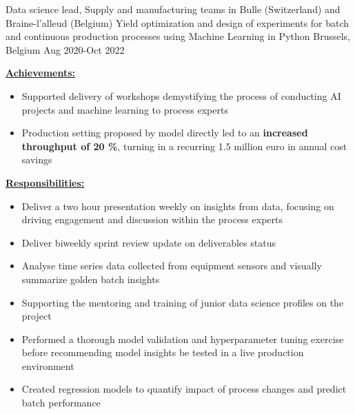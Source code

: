 \begin{cventries}
  \cventry
    {Data science lead, Supply and manufacturing teams in Bulle (Switzerland) and Braine-l'alleud (Belgium)} %
    {Yield optimization and design of experiments for batch and continuous production processes using Machine Learning in Python} %
    {Brussels, Belgium} %
    {Aug 2020-Oct 2022} %
    {
    \begin{cvitems}
        \item {\underline{\textbf{Achievements:}}}
            \begin{itemize}
                \item {Supported delivery of workshops demystifying the process of conducting AI projects and machine learning to process experts}
               \item {Production setting proposed by model directly led to an \textbf{increased throughput of 20 \%}, turning in a recurring 1.5 million euro in annual cost savings}
            \end{itemize}
        \item {\underline{\textbf{Responsibilities:}}}
         \begin{itemize}
            \item {Deliver a two hour presentation weekly on insights from data, focusing on driving engagement and discussion within the  process experts}
            \item {Deliver biweekly sprint review update on deliverables status}
            \item {Analyse time series data collected from equipment sensors and visually summarize golden batch insights}
            \item {Supporting the mentoring and training of junior data science profiles on the project}
            \item {Performed a thorough model validation and hyperparameter tuning exercise before recommending model insights be tested in a live production environment}
            \item {Created regression models to quantify impact of process changes and predict batch performance} 
         \end{itemize}
    \end{cvitems}
    }


\end{cventries}
